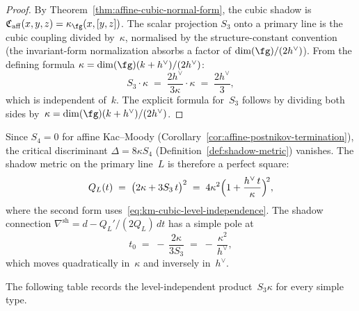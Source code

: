 \begin{proof}
By Theorem~\ref{thm:affine-cubic-normal-form}, the cubic shadow
is $\mathfrak{C}_{\mathrm{aff}}(x,y,z) = \kappa_{\fg}(x,[y,z])$.
The scalar projection $S_3$ onto a primary line is the cubic
coupling divided by~$\kappa$, normalised by the structure-constant
convention (the invariant-form normalization absorbs a factor
of $\dim(\fg)/(2h^\vee)$). From the defining formula
$\kappa = \dim(\fg)(k+h^\vee)/(2h^\vee)$:
\[
S_3 \cdot \kappa
\;=\;
\frac{2h^\vee}{3\kappa} \cdot \kappa
\;=\;
\frac{2h^\vee}{3},
\]
which is independent of~$k$. The explicit formula for~$S_3$
follows by dividing both sides
by~$\kappa = \dim(\fg)(k+h^\vee)/(2h^\vee)$.
\end{proof}

\begin{remark}%
\label{rem:affine-shadow-metric-perfect-square}
Since $S_4 = 0$ for affine Kac--Moody
\textup{(}Corollary~\textup{\ref{cor:affine-postnikov-termination})},
the critical discriminant
$\Delta = 8\kappa S_4$
\textup{(}Definition~\textup{\ref{def:shadow-metric})} vanishes.
The shadow metric on the primary line~$L$ is therefore a
perfect square:
\begin{equation}\label{eq:km-shadow-metric-perfect-square}
Q_L(t)
\;=\;
\bigl(2\kappa + 3S_3\,t\bigr)^2
\;=\;
4\kappa^2\Bigl(1 + \frac{h^\vee\,t}{\kappa}\Bigr)^{\!2},
\end{equation}
where the second form uses~\eqref{eq:km-cubic-level-independence}.
The shadow connection $\nabla^{\mathrm{sh}} = d - Q_L'/(2Q_L)\,dt$
has a simple pole at
\begin{equation}\label{eq:km-connection-pole}
t_0
\;=\;
-\,\frac{2\kappa}{3S_3}
\;=\;
-\,\frac{\kappa^2}{h^\vee},
\end{equation}
which moves quadratically in~$\kappa$ and inversely in~$h^\vee$.
\end{remark}

The following table records the level-independent product~$S_3 \kappa$
for every simple type.

